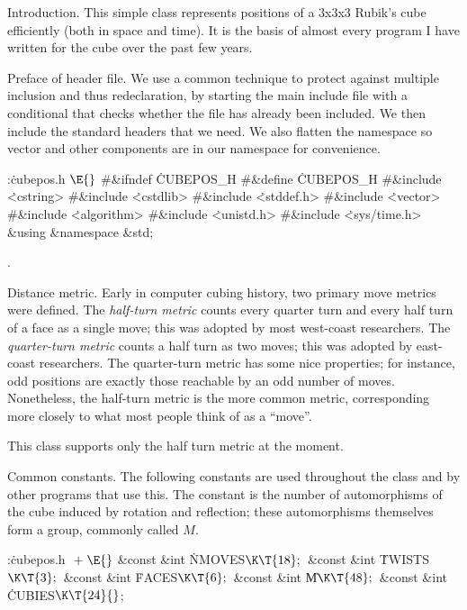 
\def\mod{\mathop{mod}}


Introduction.
This simple class represents positions of a 3x3x3 Rubik's cube
efficiently (both in space and time).  It is the basis of almost every
program I have written for the cube over the past few years.

\fi

Preface of header file.
We use a common technique to protect against multiple inclusion and
thus redeclaration, by starting the main include file with a
conditional that checks whether the file has already been included.
We then include the standard headers that we need.  We also flatten
the namespace so vector and other components are in our namespace
for convenience.

\Y\B\4:\.{cubepos.h }\X${}\E{}$\6
\8\#\&{ifndef} \.{CUBEPOS\_H}\6
\8\#\&{define} \.{CUBEPOS\_H}\6
\8\#\&{include} \.{<cstring>}\6
\8\#\&{include} \.{<cstdlib>}\6
\8\#\&{include} \.{<stddef.h>}\6
\8\#\&{include} \.{<vector>}\6
\8\#\&{include} \.{<algorithm>}\6
\8\#\&{include} \.{<unistd.h>}\6
\8\#\&{include} \.{<sys/time.h>}\6
\&{using} \&{namespace} \&{std};\par
{}.\fi

Distance metric.
Early in computer cubing history, two primary move metrics were
defined.  The {\it half-turn metric} counts every quarter turn and
every half turn of a face as a single move; this was adopted by most
west-coast researchers.  The {\it quarter-turn metric} counts a half
turn as two moves; this was adopted by east-coast researchers.  The
quarter-turn metric has some nice properties; for instance, odd
positions are exactly those reachable by an odd number of moves.
Nonetheless, the half-turn metric is the more common metric,
corresponding more closely to what most people think of as a ``move''.

This class supports only the half turn metric at the moment.

\fi

Common constants.
The following constants are used throughout the class and by other
programs that use this.  The  constant is the number of
automorphisms of the cube induced by rotation and reflection; these
automorphisms themselves form a group, commonly called $M$.

\Y\B\4:\.{cubepos.h }\X${}\mathrel+\E{}$\6
\&{const} \&{int} \.{NMOVES}${}\K\T{18};{}$\6
\&{const} \&{int} \.{TWISTS}${}\K\T{3};{}$\6
\&{const} \&{int} \.{FACES}${}\K\T{6};{}$\6
\&{const} \&{int} \|M${}\K\T{48};{}$\6
\&{const} \&{int} \.{CUBIES}${}\K\T{24}{}$;\par
\fi

